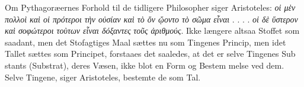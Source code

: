 \documentclass[12pt,a4paper]{book}
\newcommand{\gk}[1]{\textit{#1}}
\begin{document}
Om Pythagoræernes Forhold til de tidligere Philosopher
%
%
%
siger Aristoteles: \gk{οἱ μὲν πολλοὶ καὶ οἱ πρότεροι τὴν οὐσίαν
καὶ τὸ ὄν ᾤοντο τὸ σῶμα εἶναι} . . . . \gk{οἱ δὲ ὕστερον καὶ
σοφώτεροι τοὺτων εἶναι δόξαντες} \emph{\gk{τοῦς ἀριθμούς}}. Ikke
længere altsaa Stoffet som saadant, men det Stofagtiges Maal
sættes nu som Tingenes Princip, men idet Tallet sættes som
Principet, forstaaes det saaledes, at det er selve Tingenes Sub\-%
stants (Substrat), deres Væsen, ikke blot en Form og Bestem\-%
melse ved dem. Selve Tingene, siger Aristoteles, bestemte de
som Tal.
\end{document}

